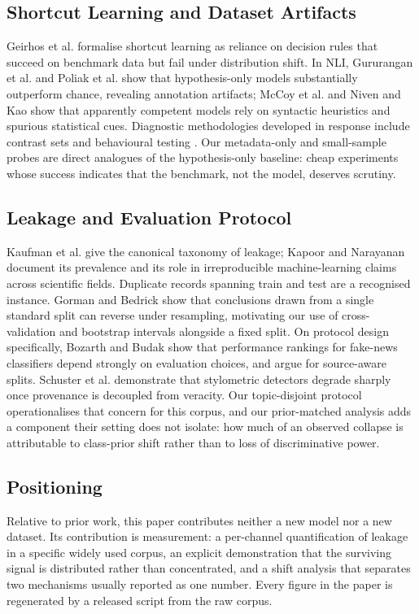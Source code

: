\documentclass[conference]{IEEEtran}
\begin{document}
\subsection{Shortcut Learning and Dataset Artifacts}
Geirhos et al. \cite{geirhos2020shortcut} formalise shortcut learning as
reliance on decision rules that succeed on benchmark data but fail under
distribution shift. In NLI, Gururangan et al. \cite{gururangan2018annotation}
and Poliak et al. \cite{poliak2018hypothesis} show that hypothesis-only models
substantially outperform chance, revealing annotation artifacts; McCoy et al.
\cite{mccoy2019right} and Niven and Kao \cite{niven2019probing} show that
apparently competent models rely on syntactic heuristics and spurious
statistical cues. Diagnostic methodologies developed in response include
contrast sets \cite{gardner2020evaluating} and behavioural testing
\cite{ribeiro2020beyond}. Our metadata-only and small-sample probes are direct
analogues of the hypothesis-only baseline: cheap experiments whose success
indicates that the benchmark, not the model, deserves scrutiny.

\subsection{Leakage and Evaluation Protocol}
Kaufman et al. \cite{kaufman2012leakage} give the canonical taxonomy of
leakage; Kapoor and Narayanan \cite{kapoor2023leakage} document its prevalence
and its role in irreproducible machine-learning claims across scientific
fields. Duplicate records spanning train and test are a recognised instance.
Gorman and Bedrick \cite{gorman2019we} show that conclusions drawn from a
single standard split can reverse under resampling, motivating our use of
cross-validation and bootstrap intervals alongside a fixed split. On protocol
design specifically, Bozarth and Budak \cite{bozarth2020toward} show that
performance rankings for fake-news classifiers depend strongly on evaluation
choices, and argue for source-aware splits. Schuster et al.
\cite{schuster2020limitations} demonstrate that stylometric detectors degrade
sharply once provenance is decoupled from veracity. Our topic-disjoint protocol
operationalises that concern for this corpus, and our prior-matched analysis
adds a component their setting does not isolate: how much of an observed
collapse is attributable to class-prior shift rather than to loss of
discriminative power.

\subsection{Positioning}
Relative to prior work, this paper contributes neither a new model nor a new
dataset. Its contribution is measurement: a per-channel quantification of
leakage in a specific widely used corpus, an explicit demonstration that the
surviving signal is distributed rather than concentrated, and a shift analysis
that separates two mechanisms usually reported as one number. Every figure in
the paper is regenerated by a released script from the raw corpus.
\end{document}
